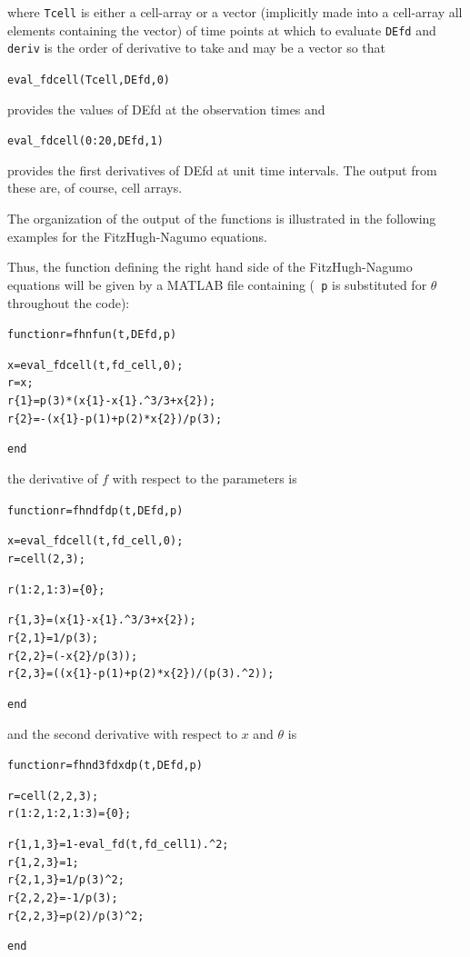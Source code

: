 \documentclass{article}
\newcommand{\nt}    {\noindent}
\begin{document}
\nt where {\tt Tcell} is either a cell-array or a vector (implicitly made
into a cell-array all elements containing the vector) of time points
at which to evaluate {\tt DEfd} and {\tt deriv} is the order of
derivative to take and may be a vector so that

\begin{alltt}
   eval_fdcell(Tcell,DEfd,0)
\end{alltt}

\nt provides the values of DEfd at the observation times and

\begin{alltt}
   eval_fdcell(0:20,DEfd,1)
\end{alltt}

\nt provides the first derivatives of DEfd at unit time intervals. The
output from these are, of course, cell arrays.

The organization of the output of the functions is illustrated in the following examples for the
FitzHugh-Nagumo equations.

Thus, the function defining the right hand side of the FitzHugh-Nagumo
equations will be given by a MATLAB file containing ({\tt
p} is substituted for $\theta$ throughout the code):

\begin{alltt}
   function r = fhnfun(t,DEfd,p)

   x = eval_fdcell(t,fd_cell,0);
   r = x;
   r\{1\} = p(3)*(x\{1\} - x\{1\}.^3/3 + x\{2\});
   r\{2\} = -(x\{1\} -p(1) + p(2)*x\{2\})/p(3);

   end
\end{alltt}

\nt the derivative of $f$ with respect to the parameters is

\begin{alltt}
   function r = fhndfdp(t,DEfd,p)

   x = eval_fdcell(t,fd_cell,0);
   r = cell(2,3);

   r(1:2,1:3) = \{0\};

   r\{1,3\} =  (x\{1\}-x\{1\}.^3/3+x\{2\});
   r\{2,1\} = 1/p(3);
   r\{2,2\} = (-x\{2\}/p(3));
   r\{2,3\} = ((x\{1\}-p(1)+p(2)*x\{2\})/(p(3).^2));

   end
\end{alltt}

\nt and the second derivative with respect to $x$ and $\theta$ is

\begin{alltt}
   function r = fhnd3fdxdp(t,DEfd,p)

   r = cell(2,2,3);
   r(1:2,1:2,1:3) = \{0\};

   r\{1,1,3\} = 1 - eval_fd(t,fd_cell{1}).^2;
   r\{1,2,3\} = 1;
   r\{2,1,3\} = 1/p(3)^2;
   r\{2,2,2\} = - 1/p(3);
   r\{2,2,3\} = p(2)/p(3)^2;

   end
\end{alltt}
\end{document}
